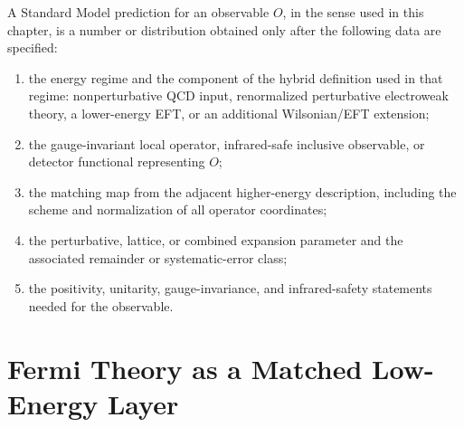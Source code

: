 \begin{definition}
\label{def:sm-hybrid-prediction}
A Standard Model prediction for an observable \(O\), in the sense used in
this chapter, is a number or distribution obtained only after the following
data are specified:
\begin{enumerate}
\item the energy regime and the component of the hybrid definition used in
      that regime: nonperturbative QCD input, renormalized perturbative
      electroweak theory, a lower-energy EFT, or an additional Wilsonian/EFT
      extension;
\item the gauge-invariant local operator, infrared-safe inclusive observable,
      or detector functional representing \(O\);
\item the matching map from the adjacent higher-energy description, including
      the scheme and normalization of all operator coordinates;
\item the perturbative, lattice, or combined expansion parameter and the
      associated remainder or systematic-error class;
\item the positivity, unitarity, gauge-invariance, and infrared-safety
      statements needed for the observable.
\end{enumerate}
\end{definition}

\section{Fermi Theory as a Matched Low-Energy Layer}

